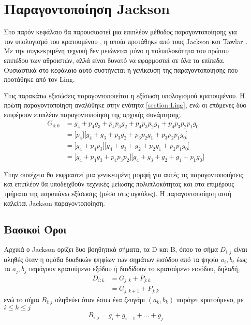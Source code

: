 \section{Παραγοντοποίηση Jackson}
\label{section:jackson}
Στο παρόν κεφάλαιο θα παρουσιαστεί μια επιπλέον μέθοδος παραγοντοποίησης 
για τον υπολογισμό του κρατουμένου , η οποία προτάθηκε από τους Jackson και 
Tawlar \cite{1399373}. Με την συγκεκριμένη τεχνική δεν μειώνεται μόνο
η πολυπλοκότητα του πρώτου επιπέδου των αθροιστών, αλλά είναι δυνατό να εφαρμοστεί σε όλα τα επίπεδα.
Ουσιαστικά στο κεφάλαιο αυτό συστήνεται η γενίκευση της 
παραγοντοποίησης που προτάθηκε από τον Ling.

Στις παρακάτω εξισώσεις παραγοντοποιείται η εξίσωση υπολογισμού κρατουμένου.
Η πρώτη παραγοντοποίηση αναλύθηκε στην ενότητα \ref{section:Ling},
ενώ οι επόμενες δύο επιφέρουν επιπλέον παραγοντοποίηση της αρχικής συνάρτησης. 
\begin{equation}
\begin{split}
    G_{4:0} &= g_4 + p_4    g_3 + p_4p_3g_2 + p_4p_3p_2g_1 + p_4p_3p_2p_1g_0 \\
            &= \Big[p_4\Big]\Big[g_4 + g_3 +p_3g_2 + p_3p_2g_1 + p_3p_2p_1g_0\Big] \\
            &=\Big[g_4 + p_4p_3\Big]\Big[g_4 + g_3 + g_2 + p_2g_1 + p_2p_1g_0\Big] \\
            &= \Big[g_4 +  p_4g_3 + p_4p_3p_2 \Big]\Big[ g_4 + g_3 + g_2 + g_1 + p_1g_0 \Big]
\end{split}
\label{jacskon_basic_eq_idea}
\end{equation}

Στην συνέχεια θα εκφραστεί μια γενικευμένη μορφή για αυτές τις παραγοντοποιήσεις και επιπλέον
θα υποδειχθούν τεχνικές μείωσης πολυπλοκότητας και στα επιμέρους τμήματα
της παραπάνω εξίσωσης (μέσα στις αγκύλες). Η παραγοντοποίηση αυτή καλείται Jackson παραγοντοποίηση.






\subsection{Βασικοί Όροι}


Αρχικά ο Jackson ορίζει δυο βοηθητικά σήματα, τα D και B,
όπου το σήμα $D_{i:j}$ είναι αληθές όταν η ομάδα δυαδικών ψηφίων των 
σημάτων εισόδου από τα ψηφία $a_i,b_i$ έως τα $a_j,b_j$ παράγουν κρατούμενο
εξόδου ή διαδίδουν το κρατούμενο εισόδου, δηλαδή,
\begin{equation}
\begin{split}
    D_{i:k} &= G_{j:k} + P_{j:k}\\
            &= G_{j:k+1} + P_{j:k}
\end{split}
\end{equation}
ενώ το σήμα $B_{i:j}$ αληθεύει όταν 
έστω ένα ζευγάρι $(a_k,b_k)$ παράγει κρατούμενο, με $i \leq k \leq j$
\begin{equation}
\begin{split}
    B_{i:j} = g_i + g_{i-1} + ... + g_j
\end{split}
\end{equation}

